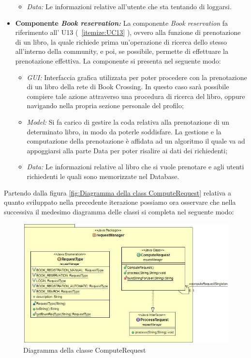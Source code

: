\begin{itemize}
\begin{itemize}
		\item \textit{Data:} Le informazioni relative all'utente che sta tentando di loggarsi.
	\end{itemize}
	\item \textbf{Componente \textit{Book reservation:}}  La componente \textit{Book reservation} fa riferimento all’ U13 (~\ref{itemize:UC13} ), ovvero alla funzione di prenotazione di un libro, la quale richiede prima un'operazione di ricerca dello stesso all'interno della community, e poi, se possibile, permette di effettuare la prenotazione  effettiva. La componente si presenta nel seguente modo:
	\begin{itemize}
		\item \textit{GUI:} Interfaccia grafica utilizzata per poter procedere con la prenotazione di un libro della rete di Book Crossing. In questo caso sarà possibile compiere tale azione attraverso una procedura di ricerca del libro, oppure navigando nella propria sezione personale del profilo;
		\item \textit{Model:} Si fa carico di gestire la coda relativa alla prenotazione di un determinato libro, in modo da poterle soddisfare. La gestione e la computazione della prenotazione è affidata ad un algoritmo il quale va ad appoggiarsi alla parte Data per poter risalire ai dati dei richiedenti;
		\item \textit{Data:} Le informazioni relative al libro che si vuole prenotare e agli utenti richiedenti le quali sono memorizzate nel Database.
	\end{itemize}
\end{itemize}
Partendo dalla figura \ref{fig:Diagramma della class ComputeRequest} relativa a quanto sviluppato nella precedente iterazione possiamo ora osservare che nella successiva il medesimo diagramma delle classi si completa nel seguente modo:
\begin{figure}[h]
	\includegraphics[width=\textwidth]{Immagini/UML_ComputeRequestServer2}
	\caption{Diagramma della classe ComputeRequest}
	\label{fig:Diagramma della class ComputeRequest2}
\end{figure}

